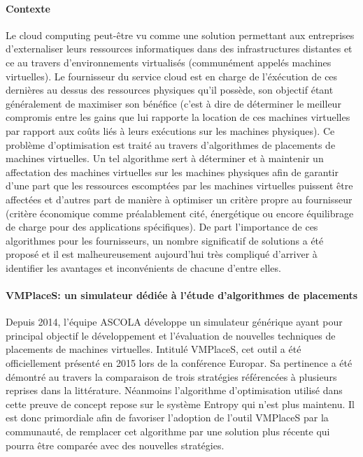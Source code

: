 \documentclass[a4paper,11pt]{article}
\begin{document}
\begin{note}
\paragraph*{Contexte\\}
   Le cloud computing peut-être vu comme une solution permettant aux entreprises
   d'externaliser leurs ressources informatiques dans des infrastructures
   distantes et ce au travers d'environnements virtualisés (communément appelés
   machines virtuelles). Le fournisseur du service cloud est en charge de
   l'éxécution de ces dernières au dessus des ressources physiques qu'il
   possède, son objectif étant généralement de maximiser son bénéfice (c'est à
   dire de déterminer le meilleur compromis entre les gains que lui rapporte la
   location de ces machines virtuelles par rapport aux coûts liés à leurs
   exécutions sur les machines physiques). Ce problème d'optimisation est traité
   au travers d'algorithmes de placements de machines virtuelles. Un tel
   algorithme sert à déterminer et à maintenir un affectation des machines
   virtuelles sur les machines physiques afin de garantir d'une part que les
   ressources escomptées par les machines virtuelles puissent être affectées et
   d'autres part de manière à optimiser un critère propre au fournisseur
   (critère économique comme préalablement cité, énergétique ou encore
   équilibrage de charge pour des applications spécifiques). De part
   l'importance de ces algorithmes pour les fournisseurs, un nombre significatif
   de solutions a été proposé et il est malheureusement aujourd'hui très
   compliqué d'arriver à identifier les avantages et inconvénients de chacune
   d'entre elles.

\paragraph*{VMPlaceS: un simulateur dédiée à l'étude d'algorithmes de placements\\}
   Depuis 2014, l'équipe ASCOLA développe un simulateur générique ayant pour
   principal objectif le développement et l'évaluation de nouvelles techniques
   de placements de machines virtuelles. Intitulé VMPlaceS, cet outil a été
   officiellement présenté en 2015 lors de la conférence Europar. Sa pertinence
   a été démontré au travers la comparaison de trois stratégies référencées à
   plusieurs reprises dans la littérature. Néanmoins l'algorithme d'optimisation
   utilisé dans cette preuve de concept repose sur le système Entropy qui n'est plus maintenu. Il est donc primordiale afin de favoriser
   l'adoption de l'outil VMPlaceS par la communauté, de
   remplacer cet algorithme par une solution plus récente qui pourra être
   comparée avec des nouvelles stratégies. 
 

\end{note}
\end{document}
